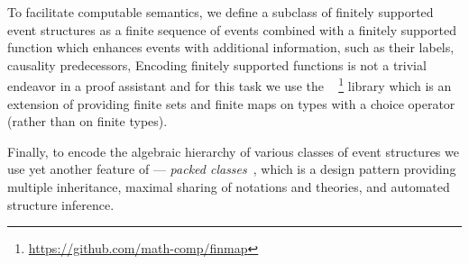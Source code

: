 To facilitate computable semantics, we define a subclass of
finitely supported event structures as a finite sequence of events
combined with a finitely supported function which enhances events with 
additional information, such as their labels, causality predecessors, \etc 
Encoding finitely supported functions is not a trivial endeavor in
a proof assistant and for this task we use the \finmap~%
\footnote{\url{https://github.com/math-comp/finmap}}
library which is an extension of \mathcomp providing finite sets and
finite maps on types with a choice operator (rather than on finite types).

Finally, to encode the algebraic hierarchy of various classes of event structures
we use yet another feature of \mathcomp --- 
\emph{packed classes}~\cite{Garillot-al:ICTPHOL2009},
which is a design pattern providing multiple inheritance,
maximal sharing of notations and theories,
and automated structure inference. %

